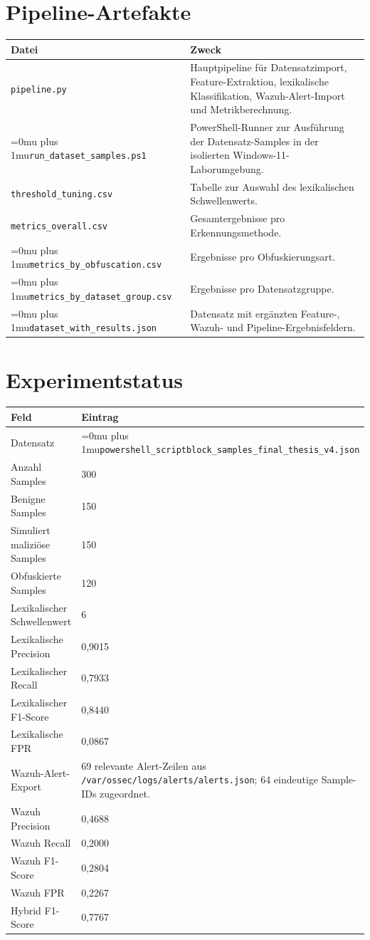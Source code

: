 \documentclass[12pt,a4paper,oneside,parskip=half]{scrreprt}
\newcommand{\codecell}[1]{\begingroup\Urlmuskip=0mu plus 1mu\relax\nolinkurl{#1}\endgroup}
\newcommand{\codebreak}[2]{\codecell{#1#2}}
\newcommand{\codebreakthree}[3]{\codecell{#1#2#3}}
\begin{document}
\chapter{Pipeline-Artefakte}
\begin{longtable}{|L{6.3cm}|L{9cm}|}
\hline
\textbf{Datei} & \textbf{Zweck}\\
\hline
\texttt{pipeline.py} & Hauptpipeline für Datensatzimport, Feature-Extraktion, lexikalische Klassifikation, Wazuh-Alert-Import und Metrikberechnung.\\
\hline
\codebreak{run\_dataset}{\_samples.ps1} & PowerShell-Runner zur Ausführung der Datensatz-Samples in der isolierten Windows-11-Laborumgebung.\\
\hline
\texttt{threshold\_tuning.csv} & Tabelle zur Auswahl des lexikalischen Schwellenwerts.\\
\hline
\texttt{metrics\_overall.csv} & Gesamtergebnisse pro Erkennungsmethode.\\
\hline
\codebreak{metrics\_by}{\_obfuscation.csv} & Ergebnisse pro Obfuskierungsart.\\
\hline
\codebreakthree{metrics\_by}{\_dataset}{\_group.csv} & Ergebnisse pro Datensatzgruppe.\\
\hline
\codebreakthree{dataset}{\_with}{\_results.json} & Datensatz mit ergänzten Feature-, Wazuh- und Pipeline-Ergebnisfeldern.\\
\hline
\end{longtable}

\chapter{Experimentstatus}
\begin{longtable}{|L{4cm}|L{10cm}|}
\hline
\textbf{Feld} & \textbf{Eintrag}\\
\hline
Datensatz & \codebreakthree{powershell\_scriptblock}{\_samples\_final}{\_thesis\_v4.json}\\
\hline
Anzahl Samples & 300\\
\hline
Benigne Samples & 150\\
\hline
Simuliert maliziöse Samples & 150\\
\hline
Obfuskierte Samples & 120\\
\hline
Lexikalischer Schwellenwert & 6\\
\hline
Lexikalische Precision & 0{,}9015\\
\hline
Lexikalischer Recall & 0{,}7933\\
\hline
Lexikalischer F1-Score & 0{,}8440\\
\hline
Lexikalische FPR & 0{,}0867\\
\hline
Wazuh-Alert-Export & 69 relevante Alert-Zeilen aus \texttt{/var/ossec/logs/alerts/alerts.json}; 64 eindeutige Sample-IDs zugeordnet.\\
\hline
Wazuh Precision & 0{,}4688\\
\hline
Wazuh Recall & 0{,}2000\\
\hline
Wazuh F1-Score & 0{,}2804\\
\hline
Wazuh FPR & 0{,}2267\\
\hline
Hybrid F1-Score & 0{,}7767\\
\hline
\end{longtable}
\end{document}
